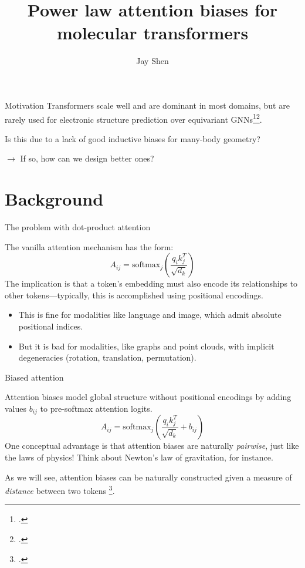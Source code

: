 \documentclass{beamer}
\title[Power law attention biases]{Power law attention biases for molecular transformers}
\author{Jay Shen}
\begin{document}
\begin{frame}
    \titlepage
\end{frame}

\begin{frame}{Motivation}
    Transformers scale well and are dominant in most domains, but are rarely used for electronic structure prediction over equivariant GNNs\footcite{li-mlip-review}\footcite{jacobs-mlip-review}.

    \vspace{1em}
    
    Is this due to a lack of good inductive biases for many-body geometry?
    
    $\rightarrow$ If so, how can we design better ones? 

\end{frame}

\section{Background}

\begin{frame}{The problem with dot-product attention}

The vanilla attention mechanism has the form:
\[
A_{ij}=\mathrm{softmax}_j\left( \frac{q_i k_j^T}{\sqrt{d_k}} \right)
\]
The implication is that a token's embedding must also encode its relationships to other tokens—typically, this is accomplished using positional encodings. 
\begin{itemize}
    \item This is fine for modalities like language and image, which admit absolute positional indices. 
    \item But it is bad for modalities, like graphs and point clouds, with implicit degeneracies (rotation, translation, permutation). 
\end{itemize}
\end{frame}

\begin{frame}{Biased attention}

Attention biases model global structure without positional encodings by adding values $b_{ij}$ to pre-softmax attention logits. 
\[
A_{ij}=\mathrm{softmax}_j\left( \frac{q_i k_j^T}{\sqrt{d_k}} + b_{ij} \right)
\]
One conceptual advantage is that attention biases are naturally \textit{pairwise}, just like the laws of physics! Think about Newton's law of gravitation, for instance. 

\vspace{1em}

As we will see, attention biases can be naturally constructed given a measure of \textit{distance} between two tokens \footcite{swin}. 

\end{frame}
\end{document}
